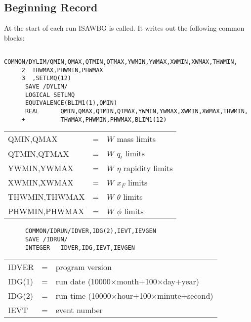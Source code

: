 \subsection{Beginning Record}

      At the start of each run ISAWBG is called. It writes out the
following common blocks:
\begin{verbatim}
      COMMON/DYLIM/QMIN,QMAX,QTMIN,QTMAX,YWMIN,YWMAX,XWMIN,XWMAX,THWMIN,
     2  THWMAX,PHWMIN,PHWMAX
     3  ,SETLMQ(12)
      SAVE /DYLIM/
      LOGICAL SETLMQ
      EQUIVALENCE(BLIM1(1),QMIN)
      REAL      QMIN,QMAX,QTMIN,QTMAX,YWMIN,YWMAX,XWMIN,XWMAX,THWMIN,
     +          THWMAX,PHWMIN,PHWMAX,BLIM1(12)
\end{verbatim}
\begin{tabular}{lcl}
QMIN,QMAX          &=& $W$ mass limits\\
QTMIN,QTMAX        &=& $W$ $q_t$ limits\\
YWMIN,YWMAX        &=& $W$ $\eta$ rapidity limits\\
XWMIN,XWMAX        &=& $W$ $x_F$ limits\\
THWMIN,THWMAX      &=& $W$ $\theta$ limits\\
PHWMIN,PHWMAX      &=& $W$ $\phi$ limits\\
\end{tabular}

\begin{verbatim}
      COMMON/IDRUN/IDVER,IDG(2),IEVT,IEVGEN
      SAVE /IDRUN/
      INTEGER   IDVER,IDG,IEVT,IEVGEN
\end{verbatim}
\begin{tabular}{lcl}
IDVER              &=& program version\\
IDG(1)             &=& run date (10000$\times$month+100$\times$day+year)\\
IDG(2)             &=& run time (10000$\times$hour+100$\times$minute+second)\\
IEVT               &=& event number\\
\end{tabular}

